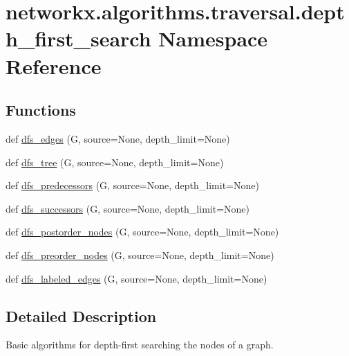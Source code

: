 \hypertarget{namespacenetworkx_1_1algorithms_1_1traversal_1_1depth__first__search}{}\section{networkx.\+algorithms.\+traversal.\+depth\+\_\+first\+\_\+search Namespace Reference}
\label{namespacenetworkx_1_1algorithms_1_1traversal_1_1depth__first__search}
\subsection*{Functions}
\begin{DoxyCompactItemize}
\item 
def \hyperlink{namespacenetworkx_1_1algorithms_1_1traversal_1_1depth__first__search_af21d1fb3164e3775e58f503238dbafdf}{dfs\+\_\+edges} (G, source=None, depth\+\_\+limit=None)
\item 
def \hyperlink{namespacenetworkx_1_1algorithms_1_1traversal_1_1depth__first__search_a1a93eceeee306c895b6261cfe2e10ad8}{dfs\+\_\+tree} (G, source=None, depth\+\_\+limit=None)
\item 
def \hyperlink{namespacenetworkx_1_1algorithms_1_1traversal_1_1depth__first__search_ae7e55ac497ad0fd8784b6a9e52142812}{dfs\+\_\+predecessors} (G, source=None, depth\+\_\+limit=None)
\item 
def \hyperlink{namespacenetworkx_1_1algorithms_1_1traversal_1_1depth__first__search_add384fc4710c29e79e99c392b08e898f}{dfs\+\_\+successors} (G, source=None, depth\+\_\+limit=None)
\item 
def \hyperlink{namespacenetworkx_1_1algorithms_1_1traversal_1_1depth__first__search_a467537ebc879a51c749e7ccd7d4ff0f7}{dfs\+\_\+postorder\+\_\+nodes} (G, source=None, depth\+\_\+limit=None)
\item 
def \hyperlink{namespacenetworkx_1_1algorithms_1_1traversal_1_1depth__first__search_a637cdd3af5e497cd1e7b1e57a0b50f4f}{dfs\+\_\+preorder\+\_\+nodes} (G, source=None, depth\+\_\+limit=None)
\item 
def \hyperlink{namespacenetworkx_1_1algorithms_1_1traversal_1_1depth__first__search_a375253318515ec0a66325ea792e091ca}{dfs\+\_\+labeled\+\_\+edges} (G, source=None, depth\+\_\+limit=None)
\end{DoxyCompactItemize}


\subsection{Detailed Description}
\begin{DoxyVerb}Basic algorithms for depth-first searching the nodes of a graph.\end{DoxyVerb}
 

